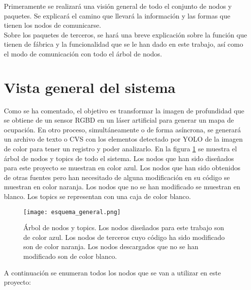 Primeramente se realizará una visión general de todo el conjunto de nodos y paquetes. Se explicará el camino que llevará la información y las formas que tienen los nodos de comunicarse.\\

Sobre los paquetes de terceros, se hará una breve explicación sobre la función que tienen de fábrica y la funcionalidad que se le han dado en este trabajo, así como el modo de comunicación con todo el árbol de nodos.\\

\section{Vista general del sistema}

Como se ha comentado, el objetivo es transformar la imagen de profundidad que se obtiene de un sensor RGBD en un láser artificial para generar un mapa de ocupación. En otro proceso, simultáneamente o de forma asíncrona, se generará un archivo de texto o CVS con los elementos detectado por YOLO de la imagen de color para tener un registro y poder analizarlo. En la figura \ref{fig:esq_general} se muestra el árbol de nodos y topics de todo el sistema. Los nodos que han sido diseñados para este proyecto se muestran en color azul. Los nodos que han sido obtenidos de otras fuentes pero han necesitado de alguna modificación en su código se muestran en color naranja. Los nodos que no se han modificado se muestran en blanco. Los topics se representan con una caja de color blanco.\\

\begin{figure}[h]
	\begin{center} 
		\texttt{[image: esquema\_general.png]}
	\end{center}
	\caption{Árbol de nodos y topics. Los nodos diseñados para este trabajo son de color azul. Los nodos de terceros cuyo código ha sido modificado son de color naranja. Los nodos descargados que no se han modificado son de color blanco.}
	\label{fig:esq_general}
\end{figure}

A continuación se enumeran todos los nodos que se van a utilizar en este proyecto:

